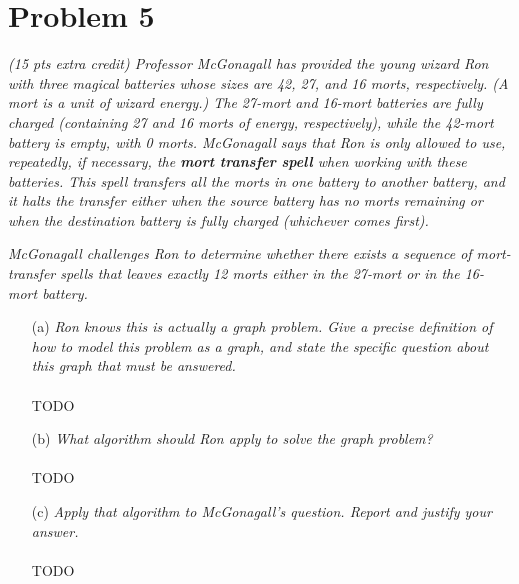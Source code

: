 \documentclass[12pt]{article} \setlength{\oddsidemargin}{0in}
\begin{document}
\newpage


\section*{Problem 5}

\textit{(15 pts extra credit) Professor McGonagall has provided the
  young wizard Ron with three magical batteries whose sizes are 42,
  27, and 16 morts, respectively. (A mort is a unit of wizard energy.)
  The 27-mort and 16-mort batteries are fully charged (containing 27
  and 16 morts of energy, respectively), while the 42-mort battery is
  empty, with 0 morts. McGonagall says that Ron is only allowed to
  use, repeatedly, if necessary, the \textbf{mort transfer spell} when
  working with these batteries. This spell transfers all the morts in
  one battery to another battery, and it halts the transfer either
  when the source battery has no morts remaining or when the
  destination battery is fully charged (whichever comes first).}

\textit{McGonagall challenges Ron to determine whether there exists a
  sequence of mort-transfer spells that leaves exactly 12 morts either
  in the 27-mort or in the 16-mort battery.}

\begin{enumerate}
\item[(a)]{\textit{Ron knows this is actually a graph problem. Give a
      precise definition of how to model this problem as a graph, and
      state the specific question about this graph that must be
      answered.}}
  \\\\
  TODO
  \\
\item[(b)]{\textit{What algorithm should Ron apply to solve the graph
      problem?}}
  \\\\
  TODO
  \\
\item[(c)]{\textit{Apply that algorithm to McGonagall’s
      question. Report and justify your answer.}}
  \\\\
  TODO

\end{enumerate}
  
\end{document}
